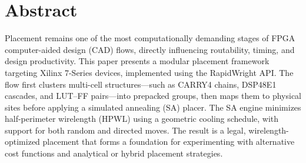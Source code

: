 \section{Abstract}
Placement remains one of the most computationally demanding stages of FPGA computer-aided design (CAD) flows, directly influencing routability, timing, and design productivity. 
This paper presents a modular placement framework targeting Xilinx 7-Series devices, implemented using the RapidWright API. 
The flow first clusters multi-cell structures—such as CARRY4 chains, DSP48E1 cascades, and LUT–FF pairs—into prepacked groups, then maps them to physical sites before applying a simulated annealing (SA) placer. 
The SA engine minimizes half-perimeter wirelength (HPWL) using a geometric cooling schedule, with support for both random and directed moves. 
The result is a legal, wirelength-optimized placement that forms a foundation for experimenting with alternative cost functions and analytical or hybrid placement strategies.

